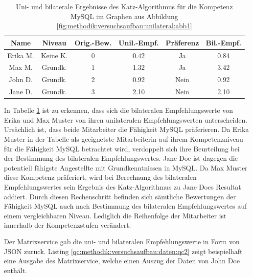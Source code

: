\begin{table}[h]
	\centering
	\begin{tabular}{c|c|c|c|c|c}
		\textbf{Name} & \textbf{Niveau} & \textbf{Orig.-Bew.} & \textbf{Unil.-Empf.} & \textbf{Präferenz} & \textbf{Bil.-Empf.}\\
		\hline
		\rowcolor{exxetagray}Erika M. & Keine K. & 0 & 0.42 & Ja   & 0.84\\
		\hline
		\rowcolor{itemcolor}Max M.    & Grundk.  & 1 & 1.32 & Ja   & 3.42\\
		\rowcolor{itemcolor}John D.   & Grundk.  & 2 & 0.92 & Nein & 0.92\\
		\rowcolor{itemcolor}Jane D.   & Grundk.  & 3 & 2.10 & Nein & 2.10
	\end{tabular}
	\caption{Uni- und bilaterale Ergebnisse des Katz-Algorithmus für die Kompetenz MySQL im Graphen aus Abbildung \ref{fig:methodik:versuchsaufbau:unilateral:abb1}}
	\label{tbl:methodik:versuchsaufbau:unilateral:tbl3}
\end{table}
\newpage
In Tabelle \ref{tbl:methodik:versuchsaufbau:unilateral:tbl3} ist zu erkennen, dass sich die bilateralen Empfehlungswerte von Erika und Max Muster von ihren unilateralen Empfehlungswerten unterscheiden. Ursächlich ist, dass beide Mitarbeiter die Fähigkeit MySQL präferieren. Da Erika Muster in der Tabelle als geeignetste Mitarbeiterin auf ihrem Kompetenzniveau für die Fähigkeit MySQL betrachtet wird, verdoppelt sich ihre Beurteilung bei der Bestimmung des bilateralen Empfehlungswertes. Jane Doe ist dagegen die potentiell fähigste Angestellte mit Grundkenntnissen in MySQL. Da Max Muster diese Kompetenz präferiert, wird bei Berechnung des bilateralen Empfehlungswertes sein Ergebnis des Katz-Algorithmus zu Jane Does Resultat addiert. Durch diesen Rechenschritt befinden sich sämtliche Bewertungen der Fähigkeit MySQL auch nach Bestimmung des bilateralen Empfehlungswertes auf einem vergleichbaren Niveau. Lediglich die Reihenfolge der Mitarbeiter ist innerhalb der Kompetenzstufen verändert.

Der Matrixservice gab die uni- und bilateralen Empfehlungswerte in Form von JSON zurück. Listing \ref{qc:methodik:versuchsaufbau:daten:qc2} zeigt beispielhaft eine Ausgabe des Matrixservice, welche einen Auszug der Daten von John Doe enthält.



